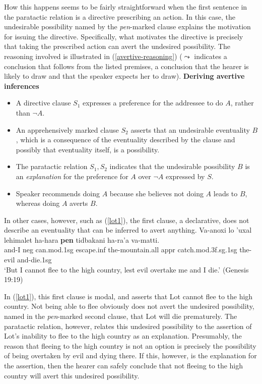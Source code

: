 \documentclass[output=paper,colorlinks,citecolor=brown]{langscibook}
\begin{document}
How this happens seems to be fairly straightforward when the first sentence in the paratactic relation is a directive prescribing an action. In this case, the undesirable possibility named by the \textit{pen}-marked clause explains the motivation for issuing the directive. Specifically, what motivates the directive is precisely that taking the prescribed action can avert the undesired possibility. The reasoning involved is illustrated in (\ref{avertive-reasoning}) ($\leadsto$ indicates a conclusion that follows from the listed premises, a conclusion that the hearer is likely to draw and that the speaker expects her to draw). 
\ea
\textnormal{\textbf{Deriving avertive inferences}}\label{avertive-reasoning}
\begin{itemize}%
\item[--] \textnormal{A directive clause $S_1$ expresses a preference for the addressee to do $A$, rather than $\neg A$.}
\item[--] \textnormal{An apprehensively marked clause $S_2$ asserts that an undesirable eventuality $B$, which is a consequence of the eventuality described by the clause and possibly that eventuality itself, is a possibility.}
\item[--] \textnormal{The paratactic relation $S_1, S_2$ indicates that the undesirable possibility $B$ is an \textit{explanation} for the preference for $A$ over $\neg A$ expressed by $S$. }
\item[$\leadsto$] \textnormal{Speaker recommends doing $A$ because she believes not doing $A$ leads to $B$, whereas doing $A$ averts $B$. }
\end{itemize}
\z
 
In other cases, however, such as (\ref{lot1}), the first clause, a declarative, does not describe an eventuality that can be inferred to avert anything. 
\ea
\label{lot1} 
\gll Va-anoxi lo 'uxal lehimalet ha-hara \textbf{pen} tidbakani ha-ra'a va-matti.\\
and-I {\sc neg} can.{\sc mod.1sg} escape.{\sc inf} the-mountain.{\sc all} {\sc appr} catch.{\sc mod.3f.sg.1sg} the-evil and-die.{\sc 1sg}  \\
\glt `But I cannot flee to the high country, lest evil overtake me and I die.' (Genesis 19:19)
\z

In (\ref{lot1}), this first clause is modal, and asserts that Lot cannot flee to the high country. Not being able to flee obviously does not avert the undesired possibility, named in the \textit{pen}-marked second clause, that Lot will die prematurely. The paratactic relation, however, relates this undesired possibility to the assertion of Lot's inability to flee to the high country as an explanation. Presumably, the reason that fleeing to the high country is not an option is precisely the possibility of being overtaken by evil and dying there. If this, however, is the explanation for the assertion, then the hearer can safely conclude that not fleeing to the high country will avert this undesired possibility. 
\end{document}
